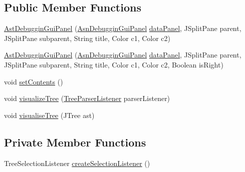 \subsection*{Public Member Functions}
\begin{DoxyCompactItemize}
\item 
\hyperlink{classit_1_1emarolab_1_1cagg_1_1debugging_1_1baseComponents_1_1customPanel_1_1AstDebugginGuiPanel_aef2cf4e2631f66d355bd5fd72694ccd6}{Ast\-Debuggin\-Gui\-Panel} (\hyperlink{classit_1_1emarolab_1_1cagg_1_1debugging_1_1baseComponents_1_1customPanel_1_1AsnDebugginGuiPanel}{Asn\-Debuggin\-Gui\-Panel} \hyperlink{classit_1_1emarolab_1_1cagg_1_1debugging_1_1baseComponents_1_1customPanel_1_1AstDebugginGuiPanel_a2b156424a1e54aa5e4ec158ba476166f}{data\-Panel}, J\-Split\-Pane parent, J\-Split\-Pane subparent, String title, Color c1, Color c2)
\item 
\hyperlink{classit_1_1emarolab_1_1cagg_1_1debugging_1_1baseComponents_1_1customPanel_1_1AstDebugginGuiPanel_a1ffbd424ef56628d1ab9e477db96a7e0}{Ast\-Debuggin\-Gui\-Panel} (\hyperlink{classit_1_1emarolab_1_1cagg_1_1debugging_1_1baseComponents_1_1customPanel_1_1AsnDebugginGuiPanel}{Asn\-Debuggin\-Gui\-Panel} \hyperlink{classit_1_1emarolab_1_1cagg_1_1debugging_1_1baseComponents_1_1customPanel_1_1AstDebugginGuiPanel_a2b156424a1e54aa5e4ec158ba476166f}{data\-Panel}, J\-Split\-Pane parent, J\-Split\-Pane subparent, String title, Color c1, Color c2, Boolean is\-Right)
\item 
void \hyperlink{classit_1_1emarolab_1_1cagg_1_1debugging_1_1baseComponents_1_1customPanel_1_1AstDebugginGuiPanel_a8332a29b3610e15205d8c9e4f4063f4a}{set\-Contents} ()
\item 
void \hyperlink{classit_1_1emarolab_1_1cagg_1_1debugging_1_1baseComponents_1_1customPanel_1_1AstDebugginGuiPanel_a31863050fce59e3b923e8a23efb99259}{visualize\-Tree} (\hyperlink{classit_1_1emarolab_1_1cagg_1_1core_1_1language_1_1parser_1_1ANTLRInterface_1_1TreeParserListener}{Tree\-Parser\-Listener} parser\-Listener)
\item 
void \hyperlink{classit_1_1emarolab_1_1cagg_1_1debugging_1_1baseComponents_1_1customPanel_1_1AstDebugginGuiPanel_a637f6812c1a2cd553d7ff23ae2409cb7}{visualise\-Tree} (J\-Tree ast)
\end{DoxyCompactItemize}
\subsection*{Private Member Functions}
\begin{DoxyCompactItemize}
\item 
Tree\-Selection\-Listener \hyperlink{classit_1_1emarolab_1_1cagg_1_1debugging_1_1baseComponents_1_1customPanel_1_1AstDebugginGuiPanel_a23b130742db273dadbeddc290b179a7d}{create\-Selection\-Listener} ()
\end{DoxyCompactItemize}

